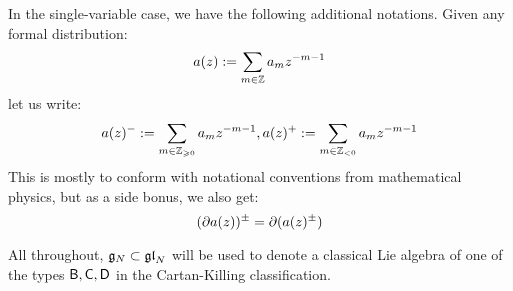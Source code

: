             In the single-variable case, we have the following additional notations. Given any formal distribution:
                $$a(z) := \sum_{m \in \mathbb{Z}} a_m z^{-m - 1}$$
            let us write:
                $$a(z)^- := \sum_{m \in \mathbb{Z}_{\geqslant 0}} a_m z^{-m - 1}, a(z)^+ := \sum_{m \in \mathbb{Z}_{< 0}} a_m z^{-m - 1}$$
            This is mostly to conform with notational conventions from mathematical physics, but as a side bonus, we also get:
                $$(\partial a(z))^{\pm} = \partial( a(z)^{\pm} )$$

            All throughout, $\mathfrak{g}_N \subset \mathfrak{gl}_N$ will be used to denote a classical Lie algebra of one of the types $\mathsf{B}, \mathsf{C}, \mathsf{D}$ in the Cartan-Killing classification.

    

    
    
    \printbibliography

